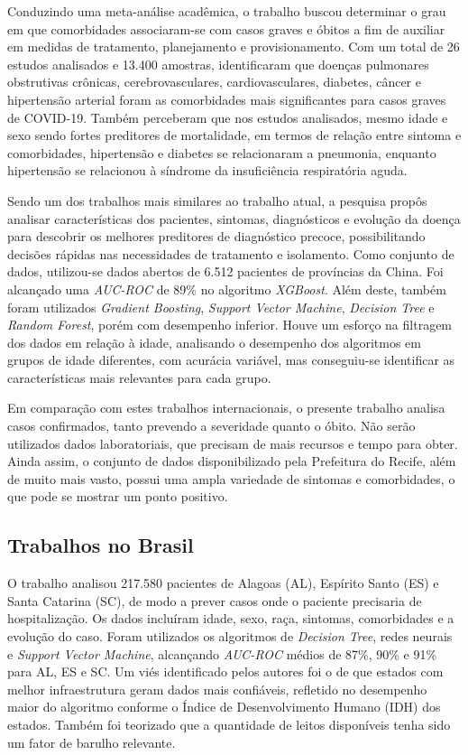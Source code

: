 Conduzindo uma meta-análise acadêmica, o trabalho \cite{metaanalise} buscou determinar o grau em que comorbidades associaram-se com casos graves e óbitos a fim de auxiliar em medidas de tratamento, planejamento e provisionamento. Com um total de 26 estudos analisados e 13.400 amostras, identificaram que doenças pulmonares obstrutivas crônicas, cerebrovasculares, cardiovasculares, diabetes, câncer e hipertensão arterial foram as comorbidades mais significantes para casos graves de COVID-19. Também perceberam que nos estudos analisados, mesmo idade e sexo sendo fortes preditores de mortalidade, em termos de relação entre sintoma e comorbidades, hipertensão e diabetes se relacionaram a pneumonia, enquanto hipertensão se relacionou à síndrome da insuficiência respiratória aguda.

Sendo um dos trabalhos mais similares ao trabalho atual, a pesquisa \cite{mdmartuza} propôs analisar características dos pacientes, sintomas, diagnósticos e evolução da doença para descobrir os melhores preditores de diagnóstico precoce, possibilitando decisões rápidas nas necessidades de tratamento e isolamento. Como conjunto de dados, utilizou-se dados abertos de 6.512 pacientes de províncias da China. Foi alcançado uma \textit{AUC-ROC} de 89\% no algoritmo \textit{XGBoost}. Além deste, também foram utilizados \textit{Gradient Boosting}, \textit{Support Vector Machine}, \textit{Decision Tree} e \textit{Random Forest}, porém com desempenho inferior. Houve um esforço na filtragem dos dados em relação à idade, analisando o desempenho dos algoritmos em grupos de idade diferentes, com acurácia variável, mas conseguiu-se identificar as características mais relevantes para cada grupo.

Em comparação com estes trabalhos internacionais, o presente trabalho analisa casos confirmados, tanto prevendo a severidade quanto o óbito. Não serão utilizados dados laboratoriais, que precisam de mais recursos e tempo para obter. Ainda assim, o conjunto de dados disponibilizado pela Prefeitura do Recife, além de muito mais vasto, possui uma ampla variedade de sintomas e comorbidades, o que pode se mostrar um ponto positivo.


\subsection{Trabalhos no Brasil}
\label{subsec:trabalhos-brasileiros}

O trabalho \cite{igor} analisou 217.580 pacientes de Alagoas (AL), Espírito Santo (ES) e Santa Catarina (SC), de modo a prever casos onde o paciente precisaria de hospitalização. Os dados incluíram idade, sexo, raça, sintomas, comorbidades e a evolução do caso. Foram utilizados os algoritmos de \textit{Decision Tree}, redes neurais e \textit{Support Vector Machine}, alcançando \textit{AUC-ROC} médios de 87\%, 90\% e 91\% para AL, ES e SC. Um viés identificado pelos autores foi o de que estados com melhor infraestrutura geram dados mais confiáveis, refletido no desempenho maior do algoritmo conforme o Índice de Desenvolvimento Humano (IDH) dos estados. Também foi teorizado que a quantidade de leitos disponíveis tenha sido um fator de barulho relevante.

